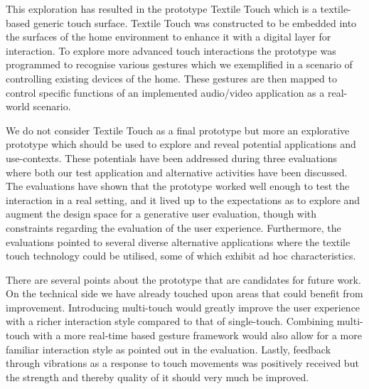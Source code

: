 This exploration has resulted in the prototype Textile Touch which is a textile-based generic touch surface.
Textile Touch was constructed to be embedded into the surfaces of the home environment to enhance it with a digital layer for interaction.
To explore more advanced touch interactions the prototype was programmed to recognise various gestures which we exemplified in a scenario of controlling existing devices of the home.
These gestures are then mapped to control specific functions of an implemented audio/video application as a real-world scenario.

We do not consider Textile Touch as a final prototype but more an explorative prototype which should be used to explore and reveal potential applications and use-contexts.
These potentials have been addressed during three evaluations where both our test application and alternative activities have been discussed.
The evaluations have shown that the prototype worked well enough to test the interaction in a real setting, and it lived up to the expectations as to explore and augment the design space for a generative user evaluation, though with constraints regarding the evaluation of the user experience. 
Furthermore, the evaluations pointed to several diverse alternative applications where the textile touch technology could be utilised, some of which exhibit ad hoc characteristics.

There are several points about the prototype that are candidates for future work.
On the technical side we have already touched upon areas that could benefit from improvement.
Introducing multi-touch would greatly improve the user experience with a richer interaction style compared to that of single-touch.
Combining multi-touch with a more real-time based gesture framework would also allow for a more familiar interaction style as pointed out in the evaluation.
Lastly, feedback through vibrations as a response to touch movements was positively received but the strength and thereby quality of it should very much be improved.